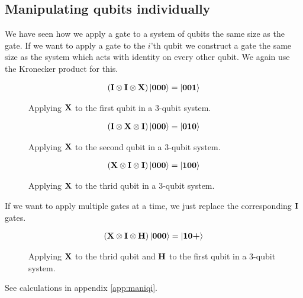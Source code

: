 \subsection{Manipulating qubits individually}\label{sec:maniqi}
We have seen how we apply a gate to a system of qubits the same size as the gate. 
If we want to apply a gate to the $i$'th qubit we construct a gate the same size as the system 
which acts with identity on every other qubit. We again use the Kronecker product for this. 

\begin{figure}[H]
    \centering
    \begin{align*}
        \left(\mathbf{I}\otimes\mathbf{I}\otimes\mathbf{X}\right)\ket{\mathbf{0}\mathbf{0}\mathbf{0}}=\ket{\mathbf{0}\mathbf{0}\mathbf{1}}
    \end{align*}
    \caption{Applying $\mathbf{X}$ to the first qubit in a 3-qubit system.}
    \label{fig:individual_application1}
\end{figure}


\begin{figure}[H]
    \centering
    \begin{align*}
        \left(\mathbf{I}\otimes\mathbf{X}\otimes\mathbf{I}\right)\ket{\mathbf{0}\mathbf{0}\mathbf{0}}=\ket{\mathbf{0}\mathbf{1}\mathbf{0}}
    \end{align*}
    \caption{Applying $\mathbf{X}$ to the second qubit in a 3-qubit system.}
    \label{fig:individual_application2}
\end{figure}
\begin{figure}[H]
    \centering
    \begin{align*}
        \left(\mathbf{X}\otimes\mathbf{I}\otimes\mathbf{I}\right)\ket{\mathbf{0}\mathbf{0}\mathbf{0}}=\ket{\mathbf{1}\mathbf{0}\mathbf{0}}
    \end{align*}
    \caption{Applying $\mathbf{X}$ to the thrid qubit in a 3-qubit system.}
    \label{fig:individual_application3}
\end{figure}
\noindent
If we want to apply multiple gates at a time, we just replace the corresponding $\mathbf{I}$ gates. 
\begin{figure}[H]
    \centering
    \begin{align*}
        \left(\mathbf{X}\otimes\mathbf{I}\otimes\mathbf{H}\right)\ket{\mathbf{0}\mathbf{0}\mathbf{0}}=\ket{\mathbf{1}\mathbf{0}\textbf{+}}
    \end{align*}
    \caption{Applying $\mathbf{X}$ to the thrid qubit and $\mathbf{H}$ to the first qubit in a 3-qubit system.}
    \label{fig:applying_multiple_gates}
\end{figure}
\noindent
See calculations in appendix \ref{app:maniqi}.

